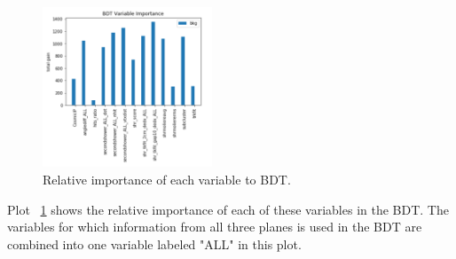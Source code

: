 \documentclass[a4paper]{article}
\begin{document}
\begin{figure}[H]
\begin{center}
\includegraphics[width=0.45\textwidth]{1e0p/bdt_vars_Run3.png}
\caption{\label{fig:1e0p:bdtvars:RUN3} Relative importance of each variable to BDT.}
\end{center}
\end{figure}

Plot ~\ref{fig:1e0p:bdtvars:RUN3} shows the relative importance of each of these variables in the BDT.  The variables for which information from all three planes is used in the BDT are combined into one variable labeled "ALL" in this plot.  
\end{document}
